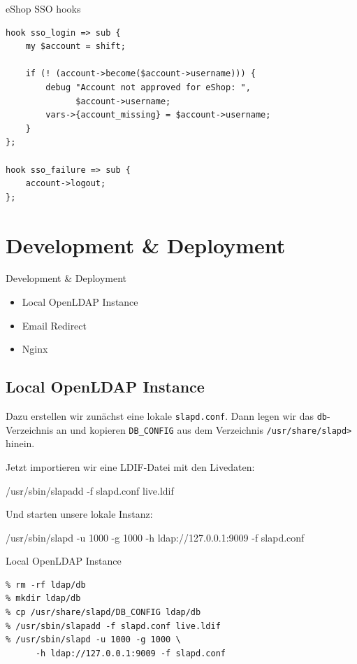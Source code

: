\begin{frame}[fragile]{eShop SSO hooks}
\begin{lstlisting}
hook sso_login => sub {
    my $account = shift;

    if (! (account->become($account->username))) {
        debug "Account not approved for eShop: ", 
              $account->username;
        vars->{account_missing} = $account->username;
    }
};

hook sso_failure => sub {
    account->logout;
};
\end{lstlisting}
\end{frame}

\section{Development \& Deployment}

\begin{frame}{Development \& Deployment}
\begin{itemize}
\item Local OpenLDAP Instance
\item Email Redirect
\item Nginx
\end{itemize}
\end{frame}

\subsection{Local OpenLDAP Instance}

Dazu erstellen wir zunächst eine lokale \verb|slapd.conf|. Dann legen
wir das \verb|db|-Verzeichnis an und kopieren \verb|DB_CONFIG| aus dem
Verzeichnis \verb|/usr/share/slapd>| hinein.

Jetzt importieren wir eine LDIF-Datei mit den Livedaten:

    /usr/sbin/slapadd -f slapd.conf live.ldif

Und starten unsere lokale Instanz:

    /usr/sbin/slapd -u 1000 -g 1000 -h ldap://127.0.0.1:9009 -f slapd.conf

\begin{frame}[fragile]{Local OpenLDAP Instance}
\begin{lstlisting}
% rm -rf ldap/db
% mkdir ldap/db
% cp /usr/share/slapd/DB_CONFIG ldap/db
% /usr/sbin/slapadd -f slapd.conf live.ldif
% /usr/sbin/slapd -u 1000 -g 1000 \
      -h ldap://127.0.0.1:9009 -f slapd.conf
\end{lstlisting}
\end{frame}

